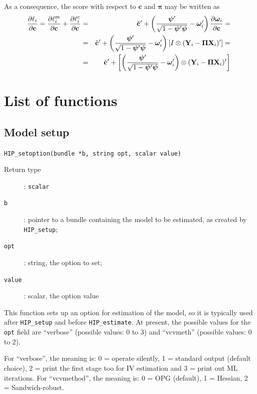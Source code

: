 \documentclass[a4paper,10pt]{article}
\newenvironment{funcdoc}[1]
{\noindent\hrulefill\newline\texttt{#1}\par\noindent\hrulefill\par\medskip\par}
{\bigskip}
\newcommand{\cmd}[1]{\texttt{#1}}
\newcounter{script}[section]
\newcommand{\pder}[2]{\ensuremath\frac{\partial #1}{\partial #2}}
\newcommand{\Endog}{\mathbf{Y}_{i}}
\newcommand{\ExoInst}{\mathbf{X}_{i}}
\newcommand{\ScRfDist}{\bm{\omega}_i}
\newcommand{\RfPar}{\bm{\Pi}}
\newcommand{\vRfPar}{\bm{\pi}}
\newcommand{\ScCov}{\bm{\psi}}
\newcommand{\vechC}{\mathbf{c}}
\begin{document}
As a consequence, the score with respect to $\vechC$ and $\vRfPar$ may
be written as
\begin{eqnarray*}
  \pder{\ell_i}{\vechC} = \pder{\ell^m_i}{\vechC} +
  \pder{\ell^c_i}{\vechC} &=&
  \tilde{\mathbf{c}}' +
  \left( \frac{\ScCov'}{\sqrt{1- \ScCov'\ScCov}} - \ScRfDist'\right)
  \pder{\ScRfDist}{\vechC} = \\
  & = & \tilde{\mathbf{c}}' +
  \left( \frac{\ScCov'}{\sqrt{1- \ScCov'\ScCov}} - \ScRfDist'\right)
  \left[I \otimes (\Endog - \RfPar \ExoInst)' \right] = \\
  & = & \tilde{\mathbf{c}}' +
  \left[
    \left( \frac{\ScCov'}{\sqrt{1- \ScCov'\ScCov}} - \ScRfDist'\right)
    \otimes (\Endog - \RfPar \ExoInst)' 
  \right] \\
\end{eqnarray*}

\section{List of functions}
\label{sec:syntax}
\subsection{Model setup}
\label{sec:gig_setup}

\begin{funcdoc}{HIP\_setoption(bundle *b, string opt, scalar value)}
  \begin{description}
  \item[Return type]: \texttt{scalar}
  \item[\texttt{b}]: pointer to a bundle containing the model to be
    estimated, as created by \cmd{HIP\_setup}; 
  \item[\texttt{opt}]: string, the option to set;
  \item[\texttt{value}]: scalar, the option value
  \end{description}

  This function sets up an option for estimation of the model, so it
  is typically used after \cmd{HIP\_setup} and before
  \cmd{HIP\_estimate}. At present, the possible values for the
  \texttt{opt} field are ``verbose'' (possible values: 0 to 3) and
  ``vcvmeth'' (possible values: 0 to 2).

  For ``verbose'', the meaning is: 0 = operate silently, 1 = standard
  output (default choice), 2 = print the first stage too for IV
  estimation and 3 = print out ML iterations.  For ``vcvmethod'', the
  meaning is: 0 = OPG (default), 1 = Hessian, 2 = Sandwich-robust.
\end{funcdoc}
\end{document}
